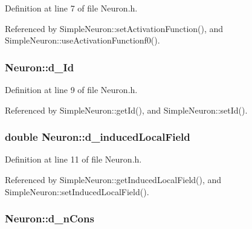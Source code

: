 Definition at line 7 of file Neuron.h.



Referenced by SimpleNeuron::setActivationFunction(), and SimpleNeuron::useActivationFunctionf0().

\hypertarget{class_neuron_ab1a34e30b663c41342e8f8eaac8bd466}{
\subsubsection[{d\_\-Id}]{ {\bf Neuron::d\_\-Id}}}
\label{class_neuron_ab1a34e30b663c41342e8f8eaac8bd466}


Definition at line 9 of file Neuron.h.



Referenced by SimpleNeuron::getId(), and SimpleNeuron::setId().

\hypertarget{class_neuron_a4370eae5b594fb4c7f544fcefa298c7c}{
\subsubsection[{d\_\-inducedLocalField}]{\setlength{\rightskip}{0pt plus 5cm}double {\bf Neuron::d\_\-inducedLocalField}}}
\label{class_neuron_a4370eae5b594fb4c7f544fcefa298c7c}


Definition at line 11 of file Neuron.h.



Referenced by SimpleNeuron::getInducedLocalField(), and SimpleNeuron::setInducedLocalField().

\hypertarget{class_neuron_ac3cb61c8582bb07bb3c61fe9fa07489b}{
\subsubsection[{d\_\-nCons}]{ {\bf Neuron::d\_\-nCons}}}
\label{class_neuron_ac3cb61c8582bb07bb3c61fe9fa07489b}


